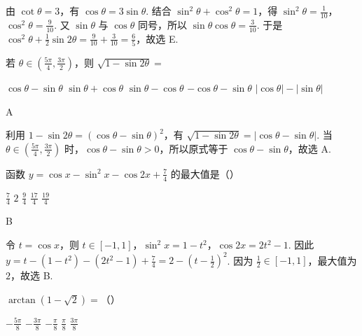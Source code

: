 \begin{solution}
由 \(\cot\theta=3\)，有 \(\cos\theta=3\sin\theta\). 结合 \(\sin^2\theta+\cos^2\theta=1\)，得 \(\sin^2\theta=\frac{1}{10}\)，\(\cos^2\theta=\frac{9}{10}\). 又 \(\sin\theta\) 与 \(\cos\theta\) 同号，所以 \(\sin\theta\cos\theta=\frac{3}{10}\). 于是 \(\cos^2\theta+\frac{1}{2}\sin2\theta=\frac{9}{10}+\frac{3}{10}=\frac{6}{5}\)，故选 E.
\end{solution}

\begin{problem}

若 \(\theta \in \left(\frac{5\pi}{4}, \frac{3\pi}{2} \right) \)，则 \(\sqrt{1 - \sin 2\theta} = \)

\choicesfive
    {\(\cos\theta-\sin\theta\)}
    {\(\sin\theta+\cos\theta\)}
    {\(\sin\theta-\cos\theta\)}
    {\(-\cos\theta-\sin\theta\)}
    {\(\left|\cos\theta\right|-\left|\sin\theta\right|\)}
\end{problem}

\begin{answer}
A
\end{answer}

\begin{solution}
利用 \(1-\sin2\theta=(\cos\theta-\sin\theta)^2\)，有 \(\sqrt{1-\sin2\theta}=|\cos\theta-\sin\theta|\). 当 \(\theta\in\left(\frac{5\pi}{4},\frac{3\pi}{2}\right)\) 时，\(\cos\theta-\sin\theta>0\)，所以原式等于 \(\cos\theta-\sin\theta\)，故选 A.
\end{solution}

\begin{problem}

函数 \(y = \cos x - \sin^2 x - \cos 2x + \frac{7}{4} \) 的最大值是（\quad）

\choicesfive
    {\(\frac{7}{4} \)}
    {\(2\)}
    {\(\frac{9}{4} \)}
    {\(\frac{17}{4} \)}
    {\(\frac{19}{4} \)}
\end{problem}

\begin{answer}
B
\end{answer}

\begin{solution}
令 \(t=\cos x\)，则 \(t\in[-1,1]\)，\(\sin^2x=1-t^2\)，\(\cos2x=2t^2-1\). 因此 \(y=t-(1-t^2)-(2t^2-1)+\frac{7}{4}=2-\left(t-\frac{1}{2}\right)^2\). 因为 \(\frac{1}{2}\in[-1,1]\)，最大值为 \(2\)，故选 B.
\end{solution}

\begin{problem}

\(\arctan\left(1-\sqrt{2}\right)= \)（\quad）

\choicesfive
    {\(-\frac{5\pi}{8} \)}
    {\(-\frac{3\pi}{8} \)}
    {\(-\frac{\pi}{8} \)}
    {\(\frac{\pi}{8} \)}
    {\(\frac{3\pi}{8} \)}
\end{problem}

